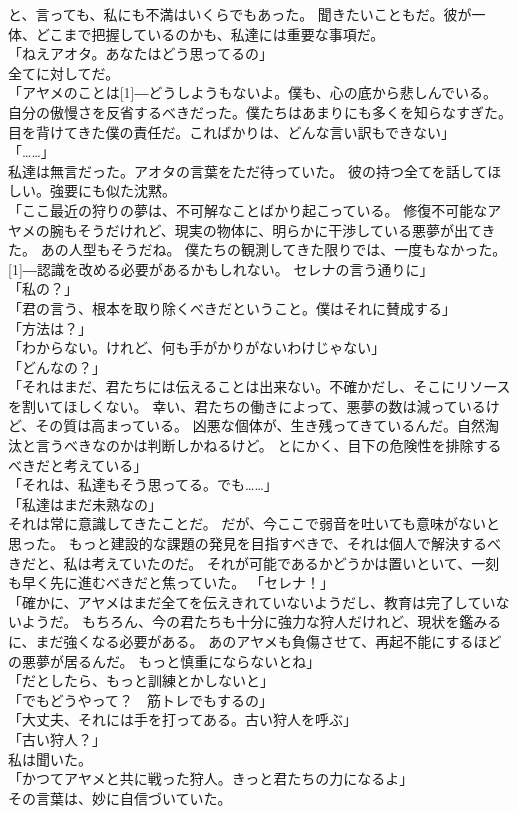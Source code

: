 \documentclass[../IHMain]{subfiles}
\begin{document}
と、言っても、私にも不満はいくらでもあった。
聞きたいこともだ。彼が一体、どこまで把握しているのかも、私達には重要な事項だ。\\
「ねえアオタ。あなたはどう思ってるの」\\
全てに対してだ。\\
「アヤメのことは\scalebox{3}[1]{―}どうしようもないよ。僕も、心の底から悲しんでいる。
自分の傲慢さを反省するべきだった。僕たちはあまりにも多くを知らなすぎた。
目を背けてきた僕の責任だ。こればかりは、どんな言い訳もできない」\\
「……」\\
私達は無言だった。アオタの言葉をただ待っていた。
彼の持つ全てを話してほしい。強要にも似た沈黙。\\
「ここ最近の狩りの夢は、不可解なことばかり起こっている。
修復不可能なアヤメの腕もそうだけれど、現実の物体に、明らかに干渉している悪夢が出てきた。
あの人型もそうだね。
僕たちの観測してきた限りでは、一度もなかった。
\scalebox{3}[1]{―}認識を改める必要があるかもしれない。
セレナの言う通りに」\\
「私の？」\\
「君の言う、根本を取り除くべきだということ。僕はそれに賛成する」\\
「方法は？」\\
「わからない。けれど、何も手がかりがないわけじゃない」\\
「どんなの？」\\
「それはまだ、君たちには伝えることは出来ない。不確かだし、そこにリソースを割いてほしくない。
幸い、君たちの働きによって、悪夢の数は減っているけど、その質は高まっている。
凶悪な個体が、生き残ってきているんだ。自然淘汰と言うべきなのかは判断しかねるけど。
とにかく、目下の危険性を排除するべきだと考えている」\\
「それは、私達もそう思ってる。でも……」\\
「私達はまだ未熟なの」\\
それは常に意識してきたことだ。
だが、今ここで弱音を吐いても意味がないと思った。
もっと建設的な課題の発見を目指すべきで、それは個人で解決するべきだと、私は考えていたのだ。
それが可能であるかどうかは置いといて、一刻も早く先に進むべきだと焦っていた。
「セレナ！」\\
「確かに、アヤメはまだ全てを伝えきれていないようだし、教育は完了していないようだ。
もちろん、今の君たちも十分に強力な狩人だけれど、現状を鑑みるに、まだ強くなる必要がある。
あのアヤメも負傷させて、再起不能にするほどの悪夢が居るんだ。
もっと慎重にならないとね」\\
「だとしたら、もっと訓練とかしないと」\\
「でもどうやって？　筋トレでもするの」\\
「大丈夫、それには手を打ってある。古い狩人を呼ぶ」\\
「古い狩人？」\\
私は聞いた。\\
「かつてアヤメと共に戦った狩人。きっと君たちの力になるよ」\\
その言葉は、妙に自信づいていた。
\end{document}
